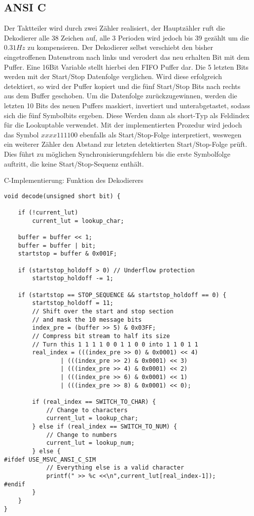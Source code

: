 \documentclass{article}
\begin{document}
\subsection{ANSI C} 
Der Taktteiler wird durch zwei Zähler realisiert, der Hauptzähler ruft die Dekodierer alle 38 
Zeichen auf, alle 3 Perioden wird jedoch bis 39 gezählt um die $0.31Hz$ zu kompensieren. 
Der Dekodierer selbst verschiebt den bisher eingetroffenen Datenstrom nach links und verodert 
das neu erhalten Bit mit dem Puffer. Eine 16Bit Variable stellt hierbei den FIFO Puffer dar. 
Die 5 letzten Bits werden mit der Start/Stop Datenfolge verglichen. Wird diese erfolgreich 
detektiert, so wird der Puffer kopiert und die fünf Start/Stop Bits nach rechts aus dem 
Buffer geschoben. Um die Datenfolge zurückzugewinnen, werden die letzten 10 Bits des neuen 
Puffers maskiert, invertiert und unterabgetastet, sodass sich die fünf Symbolbits ergeben.
Diese Werden dann als short-Typ als Feldindex für die Lookuptable verwendet.
Mit der implementierten Prozedur wird jedoch das Symbol $xxxx111100$ ebenfalls als 
Start/Stop-Folge interpretiert, weswegen ein weiterer Zähler den Abstand zur letzten detektierten Start/Stop-Folge prüft. Dies führt zu möglichen Synchronisierungsfehlern bis die erste Symbolfolge auftritt, die keine Start/Stop-Sequenz enthält. 

\begin{listing}\label{codeC:decode}
    \caption{C-Implementierung: Funktion des Dekodierers}
    \begin{verbatim}
void decode(unsigned short bit) {

    if (!current_lut) 
        current_lut = lookup_char;

    buffer = buffer << 1;
    buffer = buffer | bit;
    startstop = buffer & 0x001F;

    if (startstop_holdoff > 0) // Underflow protection
        startstop_holdoff -= 1;

    if (startstop == STOP_SEQUENCE && startstop_holdoff == 0) {
        startstop_holdoff = 11;
        // Shift over the start and stop section
        // and mask the 10 message bits
        index_pre = (buffer >> 5) & 0x03FF; 
        // Compress bit stream to half its size
        // Turn this 1 1 1 1 0 0 1 1 0 0 into 1 1 0 1 1
        real_index = (((index_pre >> 0) & 0x0001) << 4) 
                | (((index_pre >> 2) & 0x0001) << 3) 
                | (((index_pre >> 4) & 0x0001) << 2) 
                | (((index_pre >> 6) & 0x0001) << 1) 
                | (((index_pre >> 8) & 0x0001) << 0);

        if (real_index == SWITCH_TO_CHAR) {
            // Change to characters
            current_lut = lookup_char;
        } else if (real_index == SWITCH_TO_NUM) {
            // Change to numbers
            current_lut = lookup_num;
        } else {
#ifdef USE_MSVC_ANSI_C_SIM
            // Everything else is a valid character
            printf(" >> %c <<\n",current_lut[real_index-1]); 
#endif
        }
    }
}
    \end{verbatim}
\end{listing}
\end{document}
